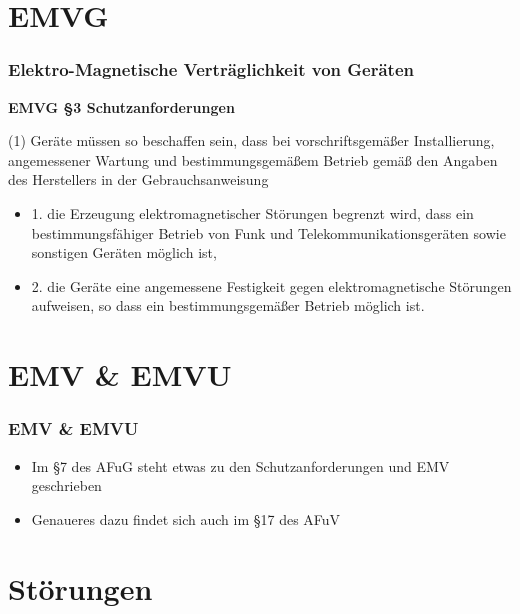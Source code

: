 \section{EMVG}
\begin{frame}
	\frametitle{\textbf{E}lektro-\textbf{M}agnetische \textbf{V}erträglichkeit von \textbf{G}eräten}
	\Large{\textbf{EMVG §3 Schutzanforderungen}}
	\begin{normalsize}
	(1) Geräte müssen so beschaffen sein, dass bei vorschriftsgemäßer Installierung, 				angemessener Wartung und bestimmungsgemäßem Betrieb gemäß den Angaben des Herstellers in 		der Gebrauchsanweisung	
	\begin{itemize}
		\item 1. die Erzeugung elektromagnetischer Störungen begrenzt wird, dass ein 							bestimmungsfähiger Betrieb von Funk und Telekommunikationsgeräten sowie 						sonstigen Geräten möglich ist, 
		\item 2. die Geräte eine angemessene Festigkeit gegen elektromagnetische Störungen 						aufweisen, so dass ein bestimmungsgemäßer Betrieb möglich ist.
	\end{itemize}
	\end{normalsize}
\end{frame}

\section{EMV \& EMVU}

\begin{frame}
	\frametitle{EMV \& EMVU}
	\begin{itemize}
		\item Im §7 des AFuG steht etwas zu den Schutzanforderungen und EMV geschrieben
		\item Genaueres dazu findet sich auch im §17 des AFuV
	\end{itemize}
\end{frame}

\section{Störungen}

